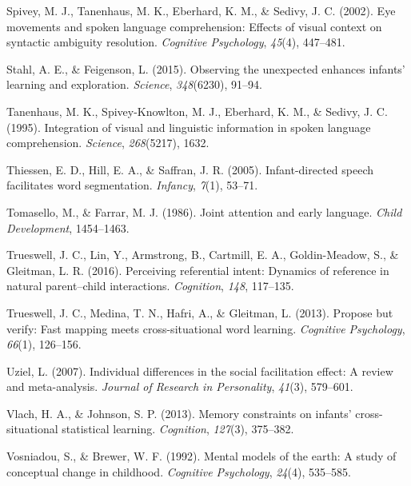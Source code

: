 \documentclass[oneside]{report}
\begin{document}
\leavevmode\hypertarget{ref-spivey2002eye}{}%
Spivey, M. J., Tanenhaus, M. K., Eberhard, K. M., \& Sedivy, J. C.
(2002). Eye movements and spoken language comprehension: Effects of
visual context on syntactic ambiguity resolution. \emph{Cognitive
Psychology}, \emph{45}(4), 447--481.

\leavevmode\hypertarget{ref-stahl2015observing}{}%
Stahl, A. E., \& Feigenson, L. (2015). Observing the unexpected enhances
infants' learning and exploration. \emph{Science}, \emph{348}(6230),
91--94.

\leavevmode\hypertarget{ref-tanenhaus1995integration}{}%
Tanenhaus, M. K., Spivey-Knowlton, M. J., Eberhard, K. M., \& Sedivy, J.
C. (1995). Integration of visual and linguistic information in spoken
language comprehension. \emph{Science}, \emph{268}(5217), 1632.

\leavevmode\hypertarget{ref-thiessen2005infant}{}%
Thiessen, E. D., Hill, E. A., \& Saffran, J. R. (2005). Infant-directed
speech facilitates word segmentation. \emph{Infancy}, \emph{7}(1),
53--71.

\leavevmode\hypertarget{ref-tomasello1986joint}{}%
Tomasello, M., \& Farrar, M. J. (1986). Joint attention and early
language. \emph{Child Development}, 1454--1463.

\leavevmode\hypertarget{ref-trueswell2016perceiving}{}%
Trueswell, J. C., Lin, Y., Armstrong, B., Cartmill, E. A.,
Goldin-Meadow, S., \& Gleitman, L. R. (2016). Perceiving referential
intent: Dynamics of reference in natural parent--child interactions.
\emph{Cognition}, \emph{148}, 117--135.

\leavevmode\hypertarget{ref-trueswell2013propose}{}%
Trueswell, J. C., Medina, T. N., Hafri, A., \& Gleitman, L. (2013).
Propose but verify: Fast mapping meets cross-situational word learning.
\emph{Cognitive Psychology}, \emph{66}(1), 126--156.

\leavevmode\hypertarget{ref-uziel2007individual}{}%
Uziel, L. (2007). Individual differences in the social facilitation
effect: A review and meta-analysis. \emph{Journal of Research in
Personality}, \emph{41}(3), 579--601.

\leavevmode\hypertarget{ref-vlach2013memory}{}%
Vlach, H. A., \& Johnson, S. P. (2013). Memory constraints on infants'
cross-situational statistical learning. \emph{Cognition}, \emph{127}(3),
375--382.

\leavevmode\hypertarget{ref-vosniadou1992mental}{}%
Vosniadou, S., \& Brewer, W. F. (1992). Mental models of the earth: A
study of conceptual change in childhood. \emph{Cognitive Psychology},
\emph{24}(4), 535--585.
\end{document}

